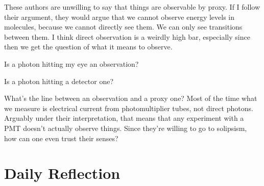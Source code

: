 \documentclass[12pt]{article}
\renewcommand{\,}{\textsuperscript{,}}
\begin{document}
These authors are unwilling to say that things are observable by proxy.  
If I follow their argument, they would argue that we cannot observe energy levels in molecules, because we cannot directly see them.  
We can only see transitions between them.  
I think direct observation is a weirdly high bar, especially since then we get the question of what it means to observe.

Is a photon hitting my eye an observation?

Is a photon hitting a detector one?

What's the line between an observation and a proxy one? Most of the time what we measure is electrical current from photomultiplier tubes, not direct photons.  
Arguably under their interpretation, that means that any experiment with a PMT doesn't actually observe things.  
Since they're willing to go to solipsism, how can one even trust their senses?

\section{Daily Reflection}
\end{document}
